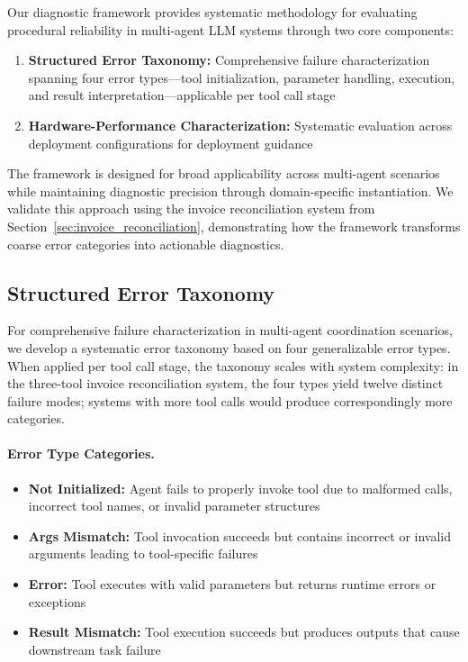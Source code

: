 Our diagnostic framework provides systematic methodology for evaluating procedural reliability in multi-agent LLM systems through two core components:

\begin{enumerate}[leftmargin=*]
    \item \textbf{Structured Error Taxonomy:} Comprehensive failure characterization spanning four error types---tool initialization, parameter handling, execution, and result interpretation---applicable per tool call stage
    \item \textbf{Hardware-Performance Characterization:} Systematic evaluation across deployment configurations for deployment guidance
\end{enumerate}

The framework is designed for broad applicability across multi-agent scenarios while maintaining diagnostic precision through domain-specific instantiation. We validate this approach using the invoice reconciliation system from Section~\ref{sec:invoice_reconciliation}, demonstrating how the framework transforms coarse error categories into actionable diagnostics.

\subsection{Structured Error Taxonomy}

For comprehensive failure characterization in multi-agent coordination scenarios, we develop a systematic error taxonomy based on four generalizable error types. When applied per tool call stage, the taxonomy scales with system complexity: in the three-tool invoice reconciliation system, the four types yield twelve distinct failure modes; systems with more tool calls would produce correspondingly more categories.

\paragraph{Error Type Categories.}

\begin{itemize}[leftmargin=*]
    \item \textbf{Not Initialized:} Agent fails to properly invoke tool due to malformed calls, incorrect tool names, or invalid parameter structures
    \item \textbf{Args Mismatch:} Tool invocation succeeds but contains incorrect or invalid arguments leading to tool-specific failures
    \item \textbf{Error:} Tool executes with valid parameters but returns runtime errors or exceptions
    \item \textbf{Result Mismatch:} Tool execution succeeds but produces outputs that cause downstream task failure
\end{itemize}

